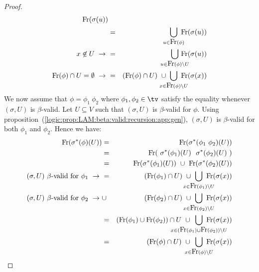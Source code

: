 \begin{proof}
\begin{eqnarray*}
        \!\!
        \free(\sigma(u))\\
        &=&
        \!\!\!\!\!
        \bigcup_{u\in\free(\phi)} 
        \!\!\!\!
        \free(\sigma(u))\\
        \mbox{$x\not\in U\ \rightarrow\ $}
        &=&
        \!\!\!\!\!\!\!\!
        \bigcup_{u\in\free(\phi)\setminus U} 
        \!\!\!\!\!\!\!\!
        \free(\sigma(u))\\
        \mbox{$\free(\phi)\cap U = \emptyset\ \rightarrow\ $} 
        &=& 
        (\free(\phi)\cap U)
        \ \cup
        \!\!\!\!\!\!\!
        \bigcup_{x\in\free(\phi)\setminus U} 
        \!\!\!\!\!\!\!
        \free(\sigma(x))
    \end{eqnarray*}
    We now assume that $\phi=\phi_{1}\ \phi_{2}$ where $\phi_{1}, \phi_{2}
    \in\tv$ satisfy the equality whenever $(\sigma,U)$ is $\beta$-valid. 
    Let $U\subseteq V$ such that $(\sigma,U)$ is $\beta$-valid for $\phi$.
    Using proposition~(\ref{logic:prop:LAM:beta:valid:recursion:app:gen}),
    $(\sigma,U)$ is $\beta$-valid for both $\phi_{1}$ and $\phi_{2}$.
    Hence we have:
    \begin{eqnarray*}
        \free(\sigma^{*}(\phi)(U))
        &=&\free(\sigma^{*}(\phi_{1}\ \phi_{2})(U))\\
        &=&\free(\ \sigma^{*}(\phi_{1})(U)\ \ \sigma^{*}(\phi_{2})(U)\ )\\
        &=&\free(\sigma^{*}(\phi_{1})(U))\ \cup\ \free(\sigma^{*}(\phi_{2})(U))\\
        \mbox{$(\sigma,U)$ $\beta$-valid for $\phi_{1}\ \rightarrow\ $}
        &=&(\free(\phi_{1})\cap U)
        \ \cup\ 
        \!\!\!\!\!\!\!\!\!\!
        \bigcup_{x\in\free(\phi_{1})\setminus U} 
        \!\!\!\!\!\!\!\!
        \free(\sigma(x))\\
        \mbox{$(\sigma,U)$ $\beta$-valid for $\phi_{2}\ \rightarrow\ $}
        &\cup&(\free(\phi_{2})\cap U)
        \ \cup\ 
        \!\!\!\!\!\!\!\!\!\!
        \bigcup_{x\in\free(\phi_{2})\setminus U} 
        \!\!\!\!\!\!\!\!
        \free(\sigma(x))\\
        &=&(\free(\phi_{1})\cup\free(\phi_{2}))\cap U
        \ \cup\ 
        \!\!\!\!\!\!\!\!\!\!\!\!\!\!\!\!\!\!\!\!
        \bigcup_{x\in(\free(\phi_{1})\cup\free(\phi_{2}))\setminus U}
        \!\!\!\!\!\!\!\!\!\!\!\!\!\!\!\!\!\!\!
        \free(\sigma(x))\\
        &=&(\free(\phi)\cap U)\ \cup\ 
        \!\!\!\!\!\!\!\!
        \bigcup_{x\in\free(\phi)\setminus U}
        \!\!\!\!\!\!\!
        \free(\sigma(x))

\end{eqnarray*}
\end{proof}
